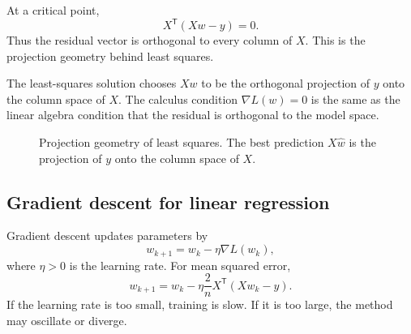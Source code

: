 \documentclass[11pt,oneside]{book}
\newcommand{\grad}{\nabla}
\newcommand{\T}{^{\mathsf T}}
\DeclareMathOperator{\col}{Col}
\begin{document}
At a critical point,
\[
X\T(Xw-y)=0.
\]
Thus the residual vector is orthogonal to every column of $X$. This is the projection geometry behind least squares.

\begin{tipbox}
The least-squares solution chooses $Xw$ to be the orthogonal projection of $y$ onto the column space of $X$. The calculus condition $\grad L(w)=0$ is the same as the linear algebra condition that the residual is orthogonal to the model space.
\end{tipbox}

\begin{figure}[H]
\centering
{}
\caption{Projection geometry of least squares. The best prediction $X\widehat w$ is the projection of $y$ onto the column space of $X$.}
\end{figure}

\subsection*{Gradient descent for linear regression}

Gradient descent updates parameters by
\[
w_{k+1}=w_k-\eta\grad L(w_k),
\]
where $\eta>0$ is the learning rate. For mean squared error,
\[
w_{k+1}=w_k-\eta\frac2n X\T(Xw_k-y).
\]
If the learning rate is too small, training is slow. If it is too large, the method may oscillate or diverge.
\end{document}
